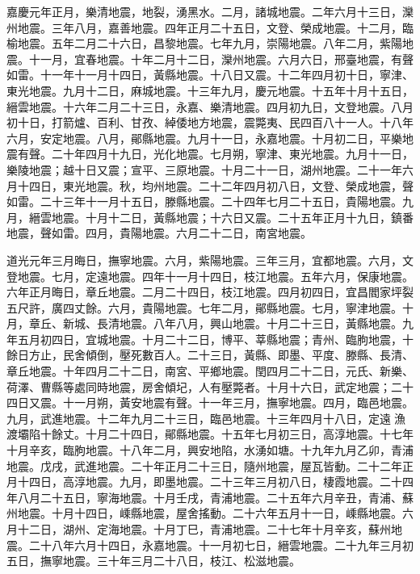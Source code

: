 \begin{pinyinscope}
嘉慶元年正月，樂清地震，地裂，湧黑水。二月，諸城地震。二年六月十三日，灤州地震。三年八月，嘉善地震。四年正月二十五日，文登、榮成地震。十二月，臨榆地震。五年二月二十六日，昌黎地震。七年九月，崇陽地震。八年二月，紫陽地震。十一月，宜春地震。十年二月十二日，灤州地震。六月六日，邢臺地震，有聲如雷。十一年十一月十四日，黃縣地震。十八日又震。十二年四月初十日，寧津、東光地震。九月十二日，麻城地震。十三年九月，慶元地震。十五年十月十五日，縉雲地震。十六年二月二十三日，永嘉、樂清地震。四月初九日，文登地震。八月初十日，打箭爐、百利、甘孜、綽倭地方地震，震斃夷、民四百八十一人。十八年六月，安定地震。八月，鄖縣地震。九月十一日，永嘉地震。十月初二日，平樂地震有聲。二十年四月十九日，光化地震。七月朔，寧津、東光地震。九月十一日，樂陵地震；越十日又震；宣平、三原地震。十月二十一日，湖州地震。二十一年六月十四日，東光地震。秋，均州地震。二十二年四月初八日，文登、榮成地震，聲如雷。二十三年十一月十五日，滕縣地震。二十四年七月二十五日，貴陽地震。九月，縉雲地震。十月十二日，黃縣地震；十六日又震。二十五年正月十九日，鎮番地震，聲如雷。四月，貴陽地震。六月二十二日，南宮地震。

道光元年三月晦日，撫寧地震。六月，紫陽地震。三年三月，宜都地震。六月，文登地震。七月，定遠地震。四年十一月十四日，枝江地震。五年六月，保康地震。六年正月晦日，章丘地震。二月二十四日，枝江地震。四月初四日，宜昌閻家坪裂五尺許，廣四丈餘。六月，貴陽地震。七年二月，鄖縣地震。七月，寧津地震。十月，章丘、新城、長清地震。八年八月，興山地震。十月二十三日，黃縣地震。九年五月初四日，宜城地震。十月二十二日，博平、莘縣地震；青州、臨朐地震，十餘日方止，民舍傾倒，壓死數百人。二十三日，黃縣、即墨、平度、滕縣、長清、章丘地震。十年四月二十二日，南宮、平鄉地震。閏四月二十二日，元氏、新樂、荷澤、曹縣等處同時地震，房舍傾圮，人有壓斃者。十月十六日，武定地震；二十四日又震。十一月朔，黃安地震有聲。十一年三月，撫寧地震。四月，臨邑地震。九月，武進地震。十二年九月二十三日，臨邑地震。十三年四月十八日，定遠漁渡壩陷十餘丈。十月二十四日，鄖縣地震。十五年七月初三日，高淳地震。十七年十月辛亥，臨朐地震。十八年二月，興安地陷，水湧如塘。十九年九月乙卯，青浦地震。戊戌，武進地震。二十年正月二十三日，隨州地震，屋瓦皆動。二十二年正月十四日，高淳地震。九月，即墨地震。二十三年三月初八日，棲霞地震。二十四年八月二十五日，寧海地震。十月壬戌，青浦地震。二十五年六月辛丑，青浦、蘇州地震。十月十四日，嵊縣地震，屋舍搖動。二十六年五月十一日，嵊縣地震。六月十二日，湖州、定海地震。十月丁巳，青浦地震。二十七年十月辛亥，蘇州地震。二十八年六月十四日，永嘉地震。十一月初七日，縉雲地震。二十九年三月初五日，撫寧地震。三十年三月二十八日，枝江、松滋地震。


\end{pinyinscope}
